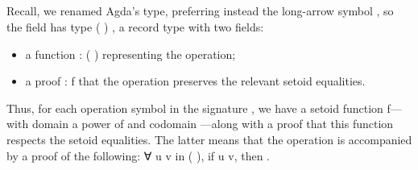 \begin{code}%
\>[0]\<%
\\
\>[0]\AgdaSpace{}%
\AgdaSpace{}%
\AgdaSpace{}%
\AgdaSpace{}%
\AgdaSymbol{:}\AgdaSpace{}%
\AgdaSpace{}%
\AgdaSymbol{(}\AgdaSpace{}%
\AgdaSpace{}%
\AgdaSpace{}%
\AgdaSpace{}%
\AgdaSpace{}%
\AgdaSymbol{(}\AgdaSpace{}%
\AgdaSpace{}%
\AgdaSymbol{))}\AgdaSpace{}%
\<%
\\
\>[0][@{}l@{\AgdaIndent{0}}]%
\>[1]%
\>[8]%
\>[16]\AgdaSymbol{:}\AgdaSpace{}%
\AgdaSpace{}%
\AgdaSpace{}%
\<%
\\
%
\>[8]%
\>[16]\AgdaSymbol{:}\AgdaSpace{}%
\AgdaSpace{}%
\AgdaSpace{}%
\AgdaSpace{}%
\AgdaSpace{}%
\AgdaSpace{}%
\<%
\\
\>[0]\<%
\end{code}
Recall, we renamed Agda's  type, preferring instead the long-arrow symbol
, so the  field has type  (  
) , a record type with two fields:
\begin{itemize}
\item a function   \as :  (   )
     representing the operation;
\item a proof  \as : \ab f  that the
operation preserves the relevant setoid equalities.
\end{itemize}
Thus, for each operation symbol in the signature , we have a setoid function
\ab f---with domain a power of  and codomain ---along with
a proof that this function respects the setoid equalities.  The latter means that the
operation  is accompanied by a proof of the following: ∀ \ab u \ab v in
 (   ), if \ab u  \ab v, then 
     .

